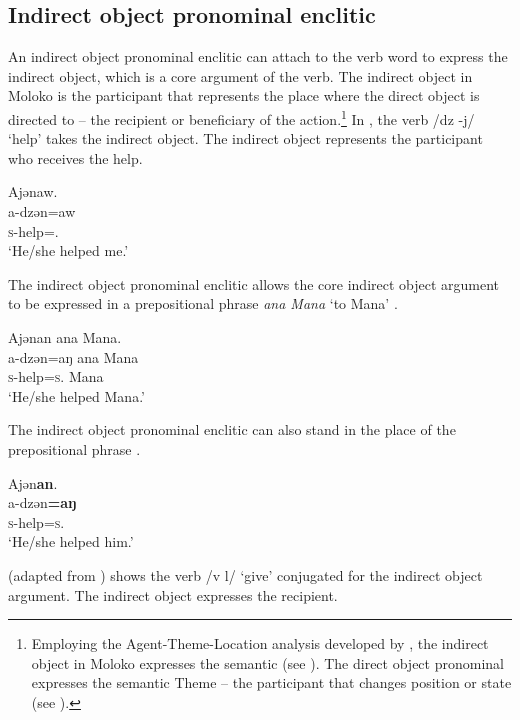 \subsection{Indirect object pronominal enclitic}\label{sec:7.3.1.1}

An indirect object pronominal enclitic can attach to the verb word to express the indirect object, which is a core argument of the verb. The indirect object in Moloko is the participant that represents the place where the direct object is directed to – the recipient or beneficiary of the action.\footnote{Employing the Agent-Theme-Location analysis developed by \citet{DeLancey1991}, the indirect object in Moloko expresses the semantic \LOC (see ). The direct object pronominal expresses the semantic Theme -- the participant that changes position or state (see ).} In , the verb /dz -j/ ‘help’ takes the indirect object. The indirect object represents the participant who receives the help. 


\ea\label{ex:7:15}
Ajənaw.\\
\gll a-dzən=aw\\
\textsc{s}-help={\oneS}.{\IO}\\
\glt ‘He/she helped me.’
\z

The indirect object pronominal enclitic allows the core indirect object argument to be expressed in a prepositional phrase \textit{ana Mana} ‘to Mana’ . 

\ea\label{ex:7:16}
Ajənan ana Mana.\\
\gll a-dzən=aŋ  ana  Mana\\
\textsc{s}-help=\textsc{s}.{\IO}  {\DAT} Mana\\
\glt ‘He/she helped Mana.’
\z

The indirect object pronominal enclitic can also stand in the place of the prepositional phrase .

\ea\label{ex:7:17}
Ajən\textbf{an}.\\
\gll a-dzən\textbf{=aŋ}\\
\textsc{s}-help=\textsc{s}.{\IO}\\
\glt ‘He/she helped him.’
\z

 (adapted from \citealt{FriesenMamalis2008}) shows the verb /v l/ ‘give’ conjugated for the indirect object argument. The indirect object expresses the recipient.

